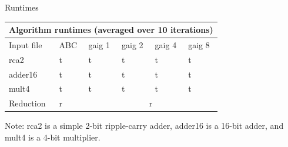 \documentclass[twocolumn]{article}
\begin{document}
\begin {table}[T]
\caption {Runtimes} \label{tab:title}
\begin{center}
\begin{tabular}{ |p{2cm}|p{1cm}|p{1cm}|p{1cm}|p{1cm}|p{1cm}| }
\hline
\multicolumn{6}{|c|}{Algorithm runtimes (averaged over 10 iterations)} \\
\hline
Input file & ABC & gaig 1 & gaig 2 & gaig 4 & gaig 8 \\
\hline
rca2 & t & t & t & t & t \\
adder16 & t & t & t & t & t \\
mult4 & t & t & t & t & t \\
\hline
Reduction & r & \multicolumn{4}{|c|}{r} \\
\hline
\end{tabular}
\caption{Note: rca2 is a simple 2-bit ripple-carry adder, adder16 is a 16-bit adder, and mult4 is a 4-bit multiplier.}
\end{center}
\end{table}
\end{document}
